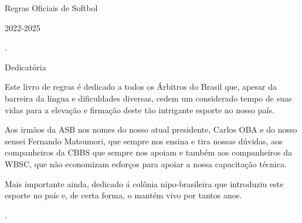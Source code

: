 \newpage
{\Huge Regras Oficiais de Softbol

 2022-2025}
\clearpage
.

\vfill
\begin{center}
	\begin{minipage}{.6\textwidth}


	{\centering\large{Dedicatória}}

	 \vspace{10mm}
	 Este livro de regras é dedicado a todos os Árbitros do Brasil que, apesar da barreira  da língua e dificuldades diversas, cedem um considerado tempo de suas vidas para a elevação e firmação deste tão intrigante esporte no nosso país.

	 Aos irmãos da ASB nos nomes do nosso atual presidente, Carlos OBA e do nosso sensei Fernando Matsumori, que sempre nos ensina e tira nossas dúvidas, aos companheiros da CBBS que sempre nos apoiam e também aos companheiros da WBSC, que não economizam esforços para apoiar a nossa capacitação técnica.

	 Mais  importante  ainda, dedicado á colônia nipo-brasileira que introduziu este esporte no país e, de certa forma, o mantém vivo por tantos anos.

	\end{minipage}
\end{center}
\vfill.

\clearpage
\dominitoc%
\tableofcontents*

